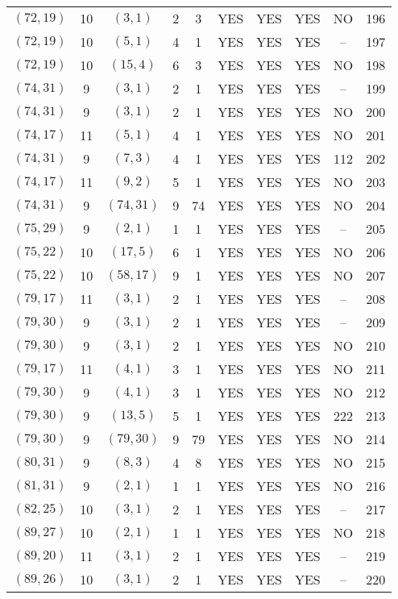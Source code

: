 \begin{longtable}{|c|c|c|c|c|c|c|c|c|c|}
$(72, 19)$ & 10 & $(3, 1)$ & 2 & 3 & YES & YES & YES & NO & 196\\
$(72, 19)$ & 10 & $(5, 1)$ & 4 & 1 & YES & YES & YES & -- & 197\\
$(72, 19)$ & 10 & $(15, 4)$ & 6 & 3 & YES & YES & YES & NO & 198\\
$(74, 31)$ & 9 & $(3, 1)$ & 2 & 1 & YES & YES & YES & -- & 199\\
$(74, 31)$ & 9 & $(3, 1)$ & 2 & 1 & YES & YES & YES & NO & 200\\
$(74, 17)$ & 11 & $(5, 1)$ & 4 & 1 & YES & YES & YES & NO & 201\\
$(74, 31)$ & 9 & $(7, 3)$ & 4 & 1 & YES & YES & YES & 112 & 202\\
$(74, 17)$ & 11 & $(9, 2)$ & 5 & 1 & YES & YES & YES & NO & 203\\
$(74, 31)$ & 9 & $(74, 31)$ & 9 & 74 & YES & YES & YES & NO & 204\\
$(75, 29)$ & 9 & $(2, 1)$ & 1 & 1 & YES & YES & YES & -- & 205\\
$(75, 22)$ & 10 & $(17, 5)$ & 6 & 1 & YES & YES & YES & NO & 206\\
$(75, 22)$ & 10 & $(58, 17)$ & 9 & 1 & YES & YES & YES & NO & 207\\
$(79, 17)$ & 11 & $(3, 1)$ & 2 & 1 & YES & YES & YES & -- & 208\\
$(79, 30)$ & 9 & $(3, 1)$ & 2 & 1 & YES & YES & YES & -- & 209\\
$(79, 30)$ & 9 & $(3, 1)$ & 2 & 1 & YES & YES & YES & NO & 210\\
$(79, 17)$ & 11 & $(4, 1)$ & 3 & 1 & YES & YES & YES & NO & 211\\
$(79, 30)$ & 9 & $(4, 1)$ & 3 & 1 & YES & YES & YES & NO & 212\\
$(79, 30)$ & 9 & $(13, 5)$ & 5 & 1 & YES & YES & YES & 222 & 213\\
$(79, 30)$ & 9 & $(79, 30)$ & 9 & 79 & YES & YES & YES & NO & 214\\
$(80, 31)$ & 9 & $(8, 3)$ & 4 & 8 & YES & YES & YES & NO & 215\\
$(81, 31)$ & 9 & $(2, 1)$ & 1 & 1 & YES & YES & YES & NO & 216\\
$(82, 25)$ & 10 & $(3, 1)$ & 2 & 1 & YES & YES & YES & -- & 217\\
$(89, 27)$ & 10 & $(2, 1)$ & 1 & 1 & YES & YES & YES & NO & 218\\
$(89, 20)$ & 11 & $(3, 1)$ & 2 & 1 & YES & YES & YES & -- & 219\\
$(89, 26)$ & 10 & $(3, 1)$ & 2 & 1 & YES & YES & YES & -- & 220\\

\end{longtable}

